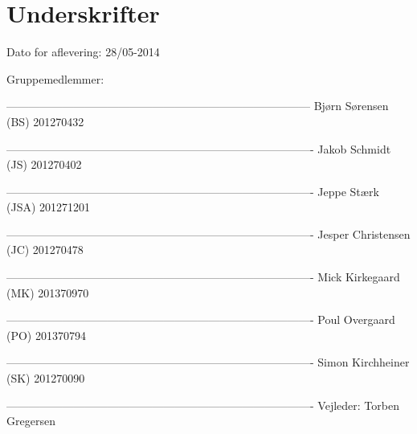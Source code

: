 \chapter*{Underskrifter}

Dato for aflevering: 28/05-2014

Gruppemedlemmer:\newline


--------------------------------------------------------------------------------- \newline
Bjørn Sørensen (BS) 201270432\newline


----------------------------------------------------------------------------------\newline
Jakob Schmidt (JS) 201270402\newline


----------------------------------------------------------------------------------\newline
Jeppe Stærk (JSA) 201271201\newline


----------------------------------------------------------------------------------\newline
Jesper Christensen (JC) 201270478\newline


----------------------------------------------------------------------------------\newline
Mick Kirkegaard (MK) 201370970\newline


----------------------------------------------------------------------------------\newline
Poul Overgaard (PO) 201370794\newline


----------------------------------------------------------------------------------\newline
Simon Kirchheiner (SK) 201270090\newline









----------------------------------------------------------------------------------\newline
Vejleder: Torben Gregersen\newline
